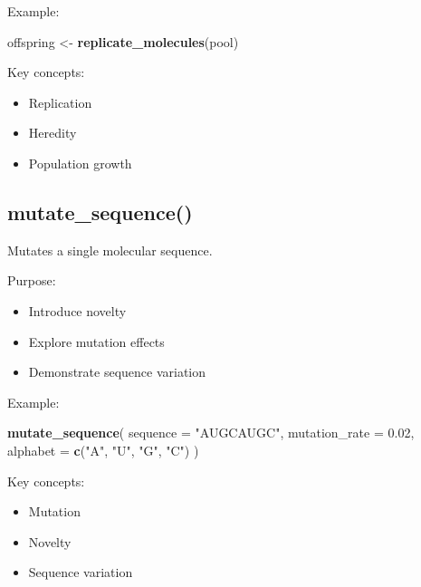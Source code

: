 \documentclass[
  oneside,
  openany]{book}
\newenvironment{Shaded}{\begin{snugshade}}{\end{snugshade}}
\newcommand{\AttributeTok}[1]{\textcolor[rgb]{0.13,0.29,0.53}{#1}}
\newcommand{\FloatTok}[1]{\textcolor[rgb]{0.00,0.00,0.81}{#1}}
\newcommand{\FunctionTok}[1]{\textcolor[rgb]{0.13,0.29,0.53}{\textbf{#1}}}
\newcommand{\NormalTok}[1]{#1}
\newcommand{\OtherTok}[1]{\textcolor[rgb]{0.56,0.35,0.01}{#1}}
\newcommand{\StringTok}[1]{\textcolor[rgb]{0.31,0.60,0.02}{#1}}
\providecommand{\tightlist}{%
  \setlength{\itemsep}{0pt}\setlength{\parskip}{0pt}}
\begin{document}
Example:

\begin{Shaded}
\begin{Highlighting}[]
\NormalTok{offspring }\OtherTok{\textless{}{-}} \FunctionTok{replicate\_molecules}\NormalTok{(pool)}
\end{Highlighting}
\end{Shaded}

Key concepts:

\begin{itemize}
\tightlist
\item
  Replication
\item
  Heredity
\item
  Population growth
\end{itemize}

\subsection{mutate\_sequence()}\label{mutate_sequence}

Mutates a single molecular sequence.

Purpose:

\begin{itemize}
\tightlist
\item
  Introduce novelty
\item
  Explore mutation effects
\item
  Demonstrate sequence variation
\end{itemize}

Example:

\begin{Shaded}
\begin{Highlighting}[]
\FunctionTok{mutate\_sequence}\NormalTok{(}
  \AttributeTok{sequence =} \StringTok{"AUGCAUGC"}\NormalTok{,}
  \AttributeTok{mutation\_rate =} \FloatTok{0.02}\NormalTok{,}
  \AttributeTok{alphabet =} \FunctionTok{c}\NormalTok{(}\StringTok{"A"}\NormalTok{, }\StringTok{"U"}\NormalTok{, }\StringTok{"G"}\NormalTok{, }\StringTok{"C"}\NormalTok{)}
\NormalTok{)}
\end{Highlighting}
\end{Shaded}

Key concepts:

\begin{itemize}
\tightlist
\item
  Mutation
\item
  Novelty
\item
  Sequence variation
\end{itemize}
\end{document}
